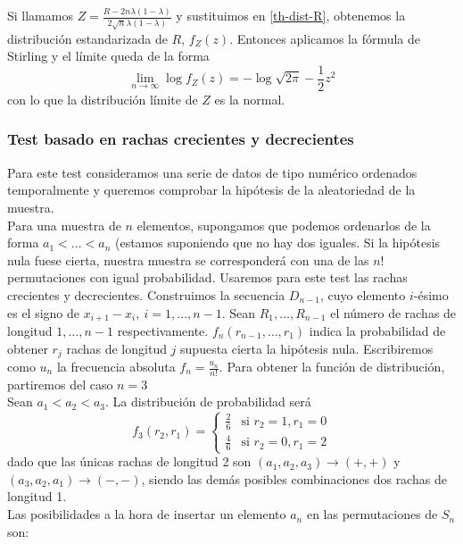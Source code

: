 	Si llamamos $Z = \frac{R - 2n\lambda (1-\lambda)}{2 \sqrt{n}\lambda (1-\lambda)}$ y sustituimos en \ref{th-dist-R}, obtenemos la distribución estandarizada de $R$, $f_Z(z)$. Entonces aplicamos la fórmula de Stirling y el límite queda de la forma
	\[ \underset{n \rightarrow \infty}{\lim} \log f_Z(z)=
			-\log \sqrt{2\pi} - \frac{1}{2} z^2	\]
	con lo que la distribución límite de $Z$ es la normal. 
	
	
\subsubsection{Test basado en rachas crecientes y decrecientes}	

	Para este test consideramos una serie de datos de tipo numérico ordenados temporalmente y queremos comprobar la hipótesis de la aleatoriedad de la muestra.\\
	Para una muestra de $n$ elementos, supongamos que podemos ordenarlos de la forma $a_1 < \dots < a_n$ (estamos suponiendo que no hay dos iguales. Si la hipótesis nula fuese cierta, nuestra muestra se corresponderá con una de las $n!$ permutaciones con igual probabilidad. Usaremos para este test las rachas crecientes y decrecientes. Construimos la secuencia $D_{n-1}$, cuyo elemento $i$-ésimo es el signo de $x_{i+1} - x_i,\ i=1, \dots, n-1$. Sean $R_1, \dots, R_{n-1}$ el número de rachas de longitud $1, \dots, n-1$ respectivamente. $f_n(r_{n-1}, \dots, r_1)$ indica la probabilidad de obtener $r_j$ rachas de longitud $j$ supuesta cierta la hipótesis nula. Escribiremos como $u_n$ la frecuencia absoluta $f_n = \frac{u_n}{n!}$. Para obtener la función de distribución, partiremos del caso $n=3$\\
	Sean $a_1 < a_2 < a_3$. La distribución de probabilidad será 
	\[ 
	f_3(r_2, r_1) = 
		\left\lbrace\begin{array}{cc}
			\frac{2}{6} & \text{si } r_2 = 1, r_1 = 0 \\
			\frac{4}{6} & \text{si } r_2 = 0, r_1 = 2 
		\end{array}\right.
	\]
	dado que las únicas rachas de longitud 2 son $(a_1, a_2, a_3) \rightarrow (+,+)$ y $(a_3, a_2, a_1) \rightarrow (-,-)$, siendo las demás posibles combinaciones dos rachas de longitud 1.\\
	Las posibilidades a la hora de insertar un elemento $a_n$ en las permutaciones de $S_n$ son:
